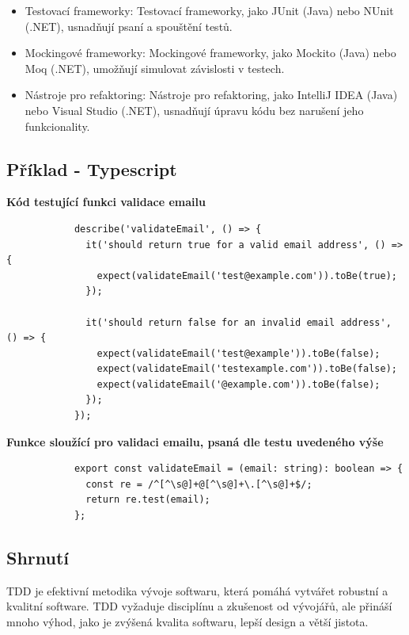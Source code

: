 \documentclass{article}
\begin{document}
\begin{Test Driven Development}
        \begin{itemize}
            \item Testovací frameworky: Testovací frameworky, jako JUnit (Java) nebo NUnit (.NET), usnadňují psaní a spouštění testů.
            \item Mockingové frameworky: Mockingové frameworky, jako Mockito (Java) nebo Moq (.NET), umožňují simulovat závislosti v testech.
            \item Nástroje pro refaktoring: Nástroje pro refaktoring, jako IntelliJ IDEA (Java) nebo Visual Studio (.NET), usnadňují úpravu kódu bez narušení jeho funkcionality.
        \end{itemize}

        \break

        \subsection{Příklad - Typescript}\label{subsec:priklad---typescript}

        \textbf{\large Kód testující funkci validace emailu}
        \begin{verbatim}
            describe('validateEmail', () => {
              it('should return true for a valid email address', () => {
                expect(validateEmail('test@example.com')).toBe(true);
              });

              it('should return false for an invalid email address', () => {
                expect(validateEmail('test@example')).toBe(false);
                expect(validateEmail('testexample.com')).toBe(false);
                expect(validateEmail('@example.com')).toBe(false);
              });
            });
        \end{verbatim}

        \textbf{\large Funkce sloužící pro validaci emailu, psaná dle testu uvedeného výše}
        \begin{verbatim}
            export const validateEmail = (email: string): boolean => {
              const re = /^[^\s@]+@[^\s@]+\.[^\s@]+$/;
              return re.test(email);
            };
        \end{verbatim}

        \subsection{Shrnutí}\label{subsec:shrnuti}
        TDD je efektivní metodika vývoje softwaru, která pomáhá vytvářet robustní a kvalitní software.
        TDD vyžaduje disciplínu a zkušenost od vývojářů, ale přináší mnoho výhod, jako je zvýšená kvalita softwaru, lepší design a větší jistota.

    \end{Test Driven Development}
\end{document}
